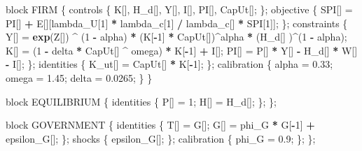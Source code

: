 \documentclass[12pt,a4paper,]{article}
\newcommand{\0}{\mathbf{0}}
\newenvironment{Shaded}{\begin{snugshade}}{\end{snugshade}}
\newcommand{\DecValTok}[1]{\textcolor[rgb]{0.00,0.00,0.81}{#1}}
\newcommand{\FloatTok}[1]{\textcolor[rgb]{0.00,0.00,0.81}{#1}}
\newcommand{\KeywordTok}[1]{\textcolor[rgb]{0.13,0.29,0.53}{\textbf{#1}}}
\newcommand{\NormalTok}[1]{#1}
\newcommand{\OperatorTok}[1]{\textcolor[rgb]{0.81,0.36,0.00}{\textbf{#1}}}
\newcommand{\StringTok}[1]{\textcolor[rgb]{0.31,0.60,0.02}{#1}}
\begin{document}
\begin{Shaded}
\begin{Highlighting}[]
\NormalTok{block FIRM}
\NormalTok{\{}
\NormalTok{    controls}
\NormalTok{    \{}
\NormalTok{        K[], H_d[], Y[], I[], PI[], CapUt[];}
\NormalTok{    \};}
\NormalTok{    objective}
\NormalTok{    \{}
\NormalTok{        SPI[] =}\StringTok{ }\NormalTok{PI[] }\OperatorTok{+}\StringTok{ }\NormalTok{E[][lambda_U[}\DecValTok{1}\NormalTok{] }\OperatorTok{*}\StringTok{ }\NormalTok{lambda_c[}\DecValTok{1}\NormalTok{] }\OperatorTok{/}\StringTok{ }\NormalTok{lambda_c[] }\OperatorTok{*}\StringTok{ }\NormalTok{SPI[}\DecValTok{1}\NormalTok{]];}
\NormalTok{    \};}
\NormalTok{    constraints}
\NormalTok{    \{}
\NormalTok{        Y[] =}\StringTok{ }\KeywordTok{exp}\NormalTok{(Z[]) }\OperatorTok{^}\StringTok{ }\NormalTok{(}\DecValTok{1} \OperatorTok{-}\StringTok{ }\NormalTok{alpha) }\OperatorTok{*}\StringTok{ }\NormalTok{(K[}\OperatorTok{-}\DecValTok{1}\NormalTok{] }\OperatorTok{*}\StringTok{ }\NormalTok{CapUt[])}\OperatorTok{^}\NormalTok{alpha }\OperatorTok{*}\StringTok{ }\NormalTok{(H_d[] )}\OperatorTok{^}\NormalTok{(}\DecValTok{1} \OperatorTok{-}\StringTok{ }\NormalTok{alpha);}
\NormalTok{        K[] =}\StringTok{ }\NormalTok{(}\DecValTok{1} \OperatorTok{-}\StringTok{ }\NormalTok{delta }\OperatorTok{*}\StringTok{ }\NormalTok{CapUt[] }\OperatorTok{^}\StringTok{ }\NormalTok{omega) }\OperatorTok{*}\StringTok{ }\NormalTok{K[}\OperatorTok{-}\DecValTok{1}\NormalTok{]  }\OperatorTok{+}\StringTok{ }\NormalTok{I[];}
\NormalTok{        PI[] =}\StringTok{ }\NormalTok{P[] }\OperatorTok{*}\StringTok{ }\NormalTok{Y[] }\OperatorTok{-}\StringTok{ }\NormalTok{H_d[] }\OperatorTok{*}\StringTok{ }\NormalTok{W[] }\OperatorTok{-}\StringTok{ }\NormalTok{I[];}
\NormalTok{    \};}
\NormalTok{    identities}
\NormalTok{    \{}
\NormalTok{        K_ut[] =}\StringTok{ }\NormalTok{CapUt[] }\OperatorTok{*}\StringTok{ }\NormalTok{K[}\OperatorTok{-}\DecValTok{1}\NormalTok{];}
\NormalTok{    \};}
\NormalTok{    calibration}
\NormalTok{    \{}
\NormalTok{        alpha =}\StringTok{ }\FloatTok{0.33}\NormalTok{;}
\NormalTok{        omega =}\StringTok{ }\FloatTok{1.45}\NormalTok{;}
\NormalTok{        delta =}\StringTok{ }\FloatTok{0.0265}\NormalTok{;}
\NormalTok{    \}}
\NormalTok{\}}


\NormalTok{block EQUILIBRIUM}
\NormalTok{\{}
\NormalTok{    identities}
\NormalTok{    \{}
\NormalTok{        P[] =}\StringTok{ }\DecValTok{1}\NormalTok{;}
\NormalTok{        H[] =}\StringTok{ }\NormalTok{H_d[];}
\NormalTok{    \};}
\NormalTok{\};}

\NormalTok{block GOVERNMENT}
\NormalTok{\{}
\NormalTok{    identities}
\NormalTok{    \{}
\NormalTok{        T[] =}\StringTok{ }\NormalTok{G[];}
\NormalTok{        G[] =}\StringTok{ }\NormalTok{phi_G }\OperatorTok{*}\StringTok{ }\NormalTok{G[}\OperatorTok{-}\DecValTok{1}\NormalTok{] }\OperatorTok{+}\StringTok{ }\NormalTok{epsilon_G[];}
\NormalTok{    \};}
\NormalTok{    shocks}
\NormalTok{    \{}
\NormalTok{        epsilon_G[];}
\NormalTok{    \};}
\NormalTok{    calibration}
\NormalTok{    \{}
\NormalTok{        phi_G =}\StringTok{ }\FloatTok{0.9}\NormalTok{;}
\NormalTok{    \};}
\NormalTok{\};}


\end{Highlighting}
\end{Shaded}
\end{document}
